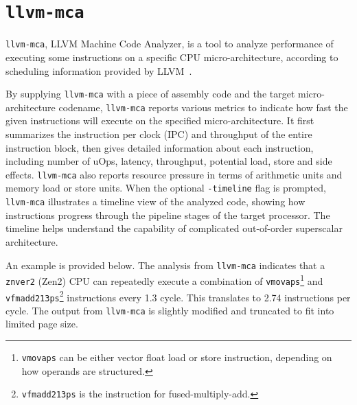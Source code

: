 \documentclass[logo,bsc,singlespacing,parskip]{infthesis}
\newcommand{\mca}{\texttt{llvm-mca}}
\begin{document}
\section{\mca{}}

\mca{}, LLVM Machine Code Analyzer, is a tool to analyze performance of executing
some instructions on a specific CPU micro-architecture, according to scheduling
information provided by LLVM~\cite{llvm-mca}. 

By supplying \mca{} with a piece of assembly code and the target
micro-architecture codename, \mca{} reports various metrics to indicate how fast
the given instructions will execute on the specified micro-architecture. It
first summarizes the instruction per clock (IPC) and throughput of the entire
instruction block, then gives detailed information about each instruction,
including number of uOps, latency, throughput, potential load, store and side
effects. \mca{} also reports resource pressure in terms of arithmetic units and
memory load or store units. When the optional \texttt{-timeline} flag is
prompted, \mca{} illustrates a timeline view of the analyzed code, showing how
instructions progress through the pipeline stages of the target processor. The
timeline helps understand the capability of complicated out-of-order superscalar
architecture. 

An example is provided below. The analysis from \mca{} indicates that a \texttt{znver2}
(Zen2) CPU can repeatedly execute a combination of 
\texttt{vmovaps}\footnote{\texttt{vmovaps} can be either vector float load or 
store instruction, depending on how operands are structured.}
and \texttt{vfmadd213ps}\footnote{\texttt{vfmadd213ps} is the instruction for 
fused-multiply-add.}
instructions every 1.3 cycle. This translates to 2.74 instructions per cycle. 
The output from \mca{} is slightly modified and truncated to fit into 
limited page size. 
\end{document}
